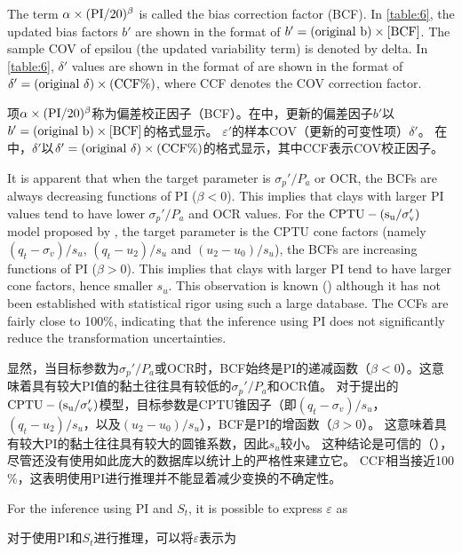 \begin{paracol}{2}

    The term  $\alpha\times{}(\rm{PI}/20)^\beta$ is called the bias correction factor (BCF). In \autoref{table:6}, the updated bias factors $b'$ are shown in the format of $b'=(\rm{original}~b)\times{}[BCF]$. The sample COV of epsilou (the updated variability term) is denoted by delta. In \autoref{table:6}, $\delta'$ values are shown in the format of are shown in the format of $\delta'=(\rm{original}~\delta)\times{}(\rm{CCF}\%)$, where CCF denotes the COV correction factor.

    \switchcolumn

    项$\alpha\times{}(\rm{PI}/20)^\beta$称为偏差校正因子（BCF）。在中，更新的偏差因子$b'$以$b'=(\rm{original}~b)\times{}[BCF]$的格式显示。 $\varepsilon'$的样本COV（更新的可变性项）$\delta'$。 在中，$\delta'$以$\delta'=(\rm{original}~\delta)\times{}(\rm{CCF}\%)$的格式显示，其中CCF表示COV校正因子。

    \switchcolumn*

    It is apparent that when the target parameter is $\sigma_p'/P_a$ or OCR, the BCFs are always decreasing functions of PI ($\beta<0$). This implies that clays with larger PI values tend to have lower $\sigma_p'/P_a$ and OCR values. For the $\rm{CPTU}-(s_u/\sigma_v')$ model proposed by \citet{Ching201252}, the target parameter is the CPTU cone factors (namely $(q_t-\sigma_v)/s_u$, $(q_t-u_2)/s_u$ and $(u_2-u_0)/s_u$), the BCFs are increasing functions of PI ($\beta>0$). This implies that clays with larger PI tend to have larger cone factors, hence smaller $s_u$. This observation is known (\citealt{Aas19861,Marsland1988209,Powell1988903}) although it has not been established with statistical rigor using such a large database. The CCFs are fairly close to 100$\%$, indicating that the inference using PI does not significantly reduce the transformation uncertainties.

    \switchcolumn

    显然，当目标参数为$\sigma_p'/P_a$或OCR时，BCF始终是PI的递减函数（$\beta<0$）。这意味着具有较大PI值的黏土往往具有较低的$\sigma_p'/P_a$和OCR值。 对于\citet{Ching201252}提出的$\rm{CPTU}-(s_u/\sigma_v')$模型，目标参数是CPTU锥因子（即$(q_t-\sigma_v)/s_u$，$(q_t-u_2)/s_u$，以及$(u_2-u_0)/s_u$），BCF是PI的增函数（$\beta>0$）。 这意味着具有较大PI的黏土往往具有较大的圆锥系数，因此$s_u$较小。 这种结论是可信的（\citealt{Aas19861,Marsland1988209,Powell1988903}），尽管还没有使用如此庞大的数据库以统计上的严格性来建立它。 CCF相当接近100$\%$，这表明使用PI进行推理并不能显着减少变换的不确定性。

    \switchcolumn*

    For the inference using PI and $S_t$, it is possible to express $\varepsilon$ as

    \switchcolumn

    对于使用PI和$S_t$进行推理，可以将$\varepsilon$表示为

\end{paracol}

